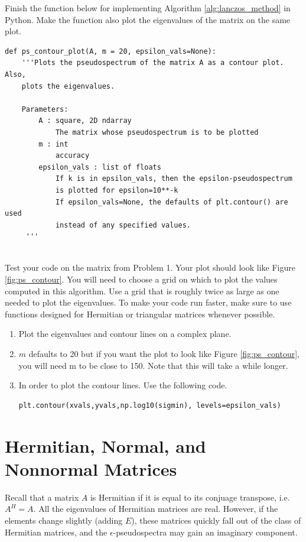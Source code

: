 \begin{problem}
Finish the function below for implementing Algorithm \ref{alg:lanczos_method} in Python. Make the function also plot the eigenvalues of the matrix on the same plot.

\begin{lstlisting}
def ps_contour_plot(A, m = 20, epsilon_vals=None):
    '''Plots the pseudospectrum of the matrix A as a contour plot.  Also,
    plots the eigenvalues.
    
    Parameters:
        A : square, 2D ndarray
            The matrix whose pseudospectrum is to be plotted
        m : int
            accuracy
        epsilon_vals : list of floats
            If k is in epsilon_vals, then the epsilon-pseudospectrum
            is plotted for epsilon=10**-k
            If epsilon_vals=None, the defaults of plt.contour() are used
            instead of any specified values.
     '''
    
\end{lstlisting}

Test your code on the matrix from Problem 1. Your plot should look like Figure \ref{fig:ps_contour}. You will need to choose a grid on which to plot the values computed in this algorithm. Use a grid that is roughly twice as large as one needed to plot the eigenvalues. To make your code run faster, make sure to use functions designed for Hermitian or triangular matrices whenever possible.
\begin{enumerate}
\item Plot the eigenvalues and contour lines on a complex plane.
\item $m$ defaults to 20 but if you want the plot to look like Figure \ref{fig:ps_contour}, you will need m to be close to 150.  Note that this will take a while longer.
\item In order to plot the contour lines.  Use the following code.
\begin{lstlisting}
plt.contour(xvals,yvals,np.log10(sigmin), levels=epsilon_vals)
\end{lstlisting}
\end{enumerate}

\end{problem}

\section*{Hermitian, Normal, and Nonnormal Matrices}
Recall that a matrix $A$ is Hermitian if it is equal to its conjuage transpose, i.e. $A^{H} = A$.  All the eigenvalues of Hermitian matrices are real.  However, if the elements change slightly (adding $E$), these matrices quickly fall out of the class of Hermitian matrices, and the $\epsilon$-pseudospectra may gain an imaginary component.

